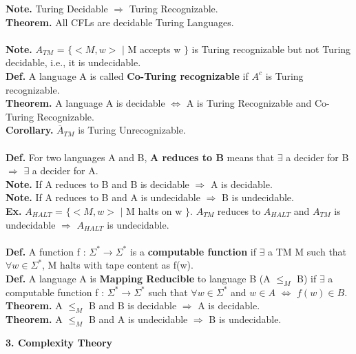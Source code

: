 \documentclass[12pt]{article}
\begin{document}
\begin{multicols}{2}
\textbf{Note.} Turing Decidable $\Rightarrow$ Turing Recognizable.\\
\textbf{Theorem.} All CFLs are decidable Turing Languages.\\\\
\textbf{Note.} $A_{TM}$ = $\big\{<M,w>$ $|$ M accepts w $\big\}$ is Turing recognizable but not Turing decidable, i.e., it is undecidable.
\\
\textbf{Def.} A language A is called \textbf{Co-Turing recognizable} if $A^{c}$ is Turing recognizable.
\\
\textbf{Theorem.} A language A is decidable $\Leftrightarrow$ A is Turing Recognizable and Co-Turing Recognizable.
\\
\textbf{Corollary.} $\overline{A}_{TM}$ is Turing Unrecognizable. 
\\\\
\textbf{Def.} For two languages A and B, \textbf{A reduces to B} means that $\exists$ a decider for B $\Rightarrow$ $\exists$ a decider for A. 
\\
\textbf{Note.} If A reduces to B and B is decidable $\Rightarrow$ A is decidable.
\\
\textbf{Note.} If A reduces to B and A is undecidable $\Rightarrow$ B is undecidable.
\\
\textbf{Ex.} $A_{HALT}$ = $\big\{<M,w>$ $|$ M halts on w $\big\}$. $A_{TM}$ reduces to $A_{HALT}$ and $A_{TM}$ is undecidable $\Rightarrow$ $A_{HALT}$ is undecidable.
\\\\
\textbf{Def.} A function f : $\Sigma^{*} \rightarrow \Sigma^{*}$ is a \textbf{computable function} if $\exists$ a TM M such that $\forall w \in \Sigma^{*}$, M halts with tape content as f(w). 
\\
\textbf{Def.} A language A is \textbf{Mapping Reducible} to language B (A $\leqslant_{M}$ B) if $\exists$ a computable function f : $\Sigma^{*} \rightarrow \Sigma^{*}$ such that $\forall w \in \Sigma^{*}$ and $w \in A$ $\Leftrightarrow$ $f(w) \in B$. 
\\
\textbf{Theorem.} A $\leqslant_{M}$ B and B is decidable $\Rightarrow$ A is decidable. 
\\
\textbf{Theorem.} A $\leqslant_{M}$ B and A is undecidable $\Rightarrow$ B is undecidable. 
\end{multicols}\pagebreak
\large
\noindent\textbf{3. Complexity Theory}
\small
\end{document}

